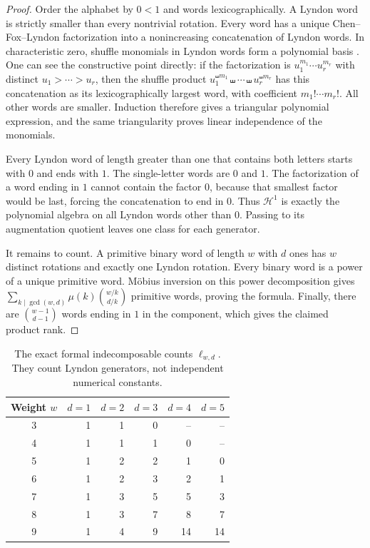 \begin{proof}
Order the alphabet by \(0<1\) and words lexicographically.
A Lyndon word is strictly smaller than every nontrivial rotation.
Every word has a unique Chen--Fox--Lyndon factorization into a
nonincreasing concatenation of Lyndon words.
In characteristic zero, shuffle monomials in Lyndon words form a
polynomial basis \cite{gaussian:Radford}. One can see the constructive point
directly: if the factorization is \(u_1^{m_1}\cdots u_r^{m_r}\) with
distinct \(u_1>\cdots>u_r\), then the shuffle product
\(u_1^{\shuffle m_1}\shuffle\cdots\shuffle u_r^{\shuffle m_r}\)
has this concatenation as its lexicographically largest word, with
coefficient \(m_1!\cdots m_r!\). All other words are smaller.
Induction therefore gives a triangular polynomial expression, and the
same triangularity proves linear independence of the monomials.

Every Lyndon word of length greater than one that contains both letters
starts with \(0\) and ends with \(1\). The single-letter words are
\(0\) and \(1\). The factorization of a word ending in \(1\) cannot
contain the factor \(0\), because that smallest factor would be last,
forcing the concatenation to end in \(0\).
Thus \(\mathcal H^1\) is exactly the polynomial algebra on all Lyndon
words other than \(0\). Passing to its augmentation quotient leaves
one class for each generator.

It remains to count. A primitive binary word of length \(w\) with
\(d\) ones has \(w\) distinct rotations and exactly one Lyndon rotation.
Every binary word is a power of a unique primitive word.
M\"obius inversion on this power decomposition gives
\(\sum_{k\mid\gcd(w,d)}\mu(k)\binom{w/k}{d/k}\)
primitive words, proving the formula. Finally, there are
\(\binom{w-1}{d-1}\) words ending in \(1\) in the component, which
gives the claimed product rank.
\end{proof}

\begin{table}[htbp]
\centering
\begin{tabular}{c|rrrrr}
\toprule
Weight \(w\)&\(d=1\)&\(d=2\)&\(d=3\)&\(d=4\)&\(d=5\)\\
\midrule
3&1&1&0&--&--\\
4&1&1&1&0&--\\
5&1&2&2&1&0\\
6&1&2&3&2&1\\
7&1&3&5&5&3\\
8&1&3&7&8&7\\
9&1&4&9&14&14\\
\bottomrule
\end{tabular}
\caption{The exact formal indecomposable counts \(\ell_{w,d}\).
They count Lyndon generators, not independent numerical constants.}
\label{gaussian:tab:witt}
\end{table}

